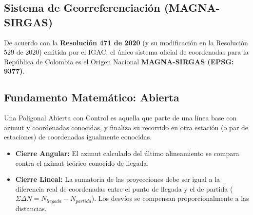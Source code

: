 \documentclass[11pt,letterpaper]{article}
\begin{document}
\subsection{Sistema de Georreferenciación (MAGNA-SIRGAS)}
De acuerdo con la \textbf{Resolución 471 de 2020} (y su modificación en la Resolución 529 de 2020) emitida por el IGAC, el único sistema oficial de coordenadas para la República de Colombia es el Origen Nacional \textbf{MAGNA-SIRGAS (EPSG: 9377)}.
\subsection{Fundamento Matemático: Abierta}
Una Poligonal Abierta con Control es aquella que parte de una línea base con azimut y coordenadas conocidas, y finaliza su recorrido en otra estación (o par de estaciones) de coordenadas igualmente conocidas.
\begin{itemize}
  \item \textbf{Cierre Angular:} El azimut calculado del último alineamiento se compara contra el azimut teórico conocido de llegada.
  \item \textbf{Cierre Lineal:} La sumatoria de las proyecciones debe ser igual a la diferencia real de coordenadas entre el punto de llegada y el de partida ($\Sigma \Delta N = N_{llegada} - N_{partida}$). Los desvíos se compensan proporcionalmente a las distancias.
\end{itemize}
\end{document}
